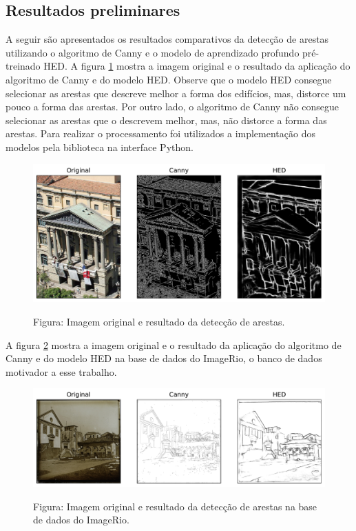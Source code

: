 \documentclass[12pt]{article}
\begin{document}
\subsection{Resultados preliminares}

A seguir são apresentados os resultados comparativos da detecção de arestas utilizando o algoritmo de Canny e o modelo de aprendizado profundo pré-treinado HED. A figura \ref{fig:arestas} mostra a imagem original e o resultado da aplicação do algoritmo de Canny e do modelo HED. Observe que o modelo HED consegue selecionar as arestas que descreve melhor a forma dos edifícios, mas, distorce um pouco a forma das arestas. Por outro lado, o algoritmo de Canny não consegue selecionar as arestas que o descrevem melhor, mas, não distorce a forma das arestas. Para realizar o processamento foi utilizados a implementação dos modelos pela biblioteca \cite[Opencv]{opencv_library} na interface Python.


\begin{figure}[H]
\centering
\includegraphics[scale=0.60]{bib_sub_filtro.pdf}
\label{fig:arestas}
\begin{center}
Figura: Imagem original e resultado da detecção de arestas.
\end{center}
\end{figure}

A figura \ref{fig:bdarestas} mostra a imagem original e o resultado da aplicação do algoritmo de Canny e do modelo HED na base de dados do ImageRio, o banco de dados motivador a esse trabalho.

\begin{figure}
\centering
\includegraphics[scale=0.60]{exemple_edge.pdf}
\label{fig:bdarestas}
\begin{center}
Figura: Imagem original e resultado da detecção de arestas na base de dados do ImageRio.
\end{center}
\end{figure}
\end{document}
